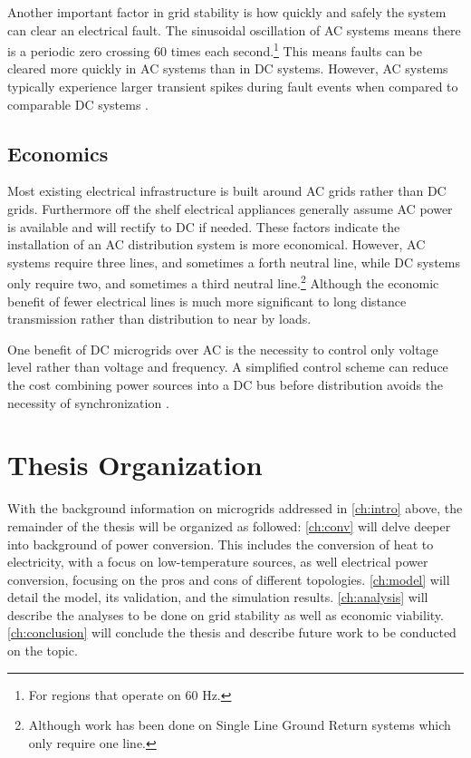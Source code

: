 Another important factor in grid stability is how quickly and safely the system can clear an electrical fault. The sinusoidal oscillation of AC systems means there is a periodic zero crossing 60 times each second.\footnote{For regions that operate on 60 Hz.} This means faults can be cleared more quickly in AC systems than in DC systems.  However, AC systems typically experience larger transient spikes during fault events when compared to comparable DC systems \cite{Estes2011}. 

\subsection{Economics}
Most existing electrical infrastructure is built around AC grids rather than DC grids. Furthermore off the shelf electrical appliances generally assume AC power is available and will rectify to DC if needed. These factors indicate the installation of an AC distribution system is more economical. However, AC systems require three lines, and sometimes a forth neutral line, while DC systems only require two, and sometimes a third neutral line.\footnote{Although work has been done on Single Line Ground Return systems which only require one line.} Although the economic benefit of fewer electrical lines is much more significant to long distance transmission rather than distribution to near by loads.

One benefit of DC microgrids over AC is the necessity to control only voltage level rather than voltage and frequency. A simplified control scheme can reduce the cost combining power sources into a DC bus before distribution avoids the necessity of synchronization \cite{Lotfi2015}.

\section{Thesis Organization}
With the background information on microgrids addressed in \autoref{ch:intro} above, the remainder of the thesis will be organized as followed: \autoref{ch:conv} will delve deeper into background of power conversion. This includes the conversion of heat to electricity, with a focus on low-temperature sources, as well electrical power conversion, focusing on the pros and cons of different topologies. 
\autoref{ch:model} will detail the model, its validation, and the simulation results. \autoref{ch:analysis} will describe the analyses to be done on grid stability as well as economic viability.  \autoref{ch:conclusion} will conclude the thesis and describe future work to be conducted on the topic.


